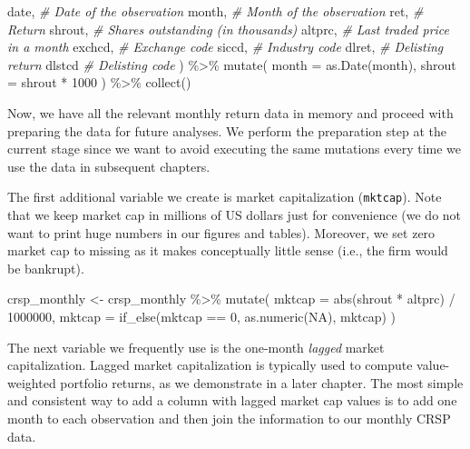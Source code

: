 \documentclass[
]{krantz}
\newenvironment{Shaded}{\begin{snugshade}}{\end{snugshade}}
\newcommand{\AttributeTok}[1]{\textcolor[rgb]{0.61,0.61,0.61}{#1}}
\newcommand{\CommentTok}[1]{\textcolor[rgb]{0.37,0.37,0.37}{\textit{#1}}}
\newcommand{\ConstantTok}[1]{\textcolor[rgb]{0,0,0}{#1}}
\newcommand{\DecValTok}[1]{\textcolor[rgb]{0.06,0.06,0.06}{#1}}
\newcommand{\FunctionTok}[1]{\textcolor[rgb]{0,0,0}{#1}}
\newcommand{\NormalTok}[1]{#1}
\newcommand{\OtherTok}[1]{\textcolor[rgb]{0.37,0.37,0.37}{#1}}
\newcommand{\SpecialCharTok}[1]{\textcolor[rgb]{0,0,0}{#1}}
\begin{document}
\begin{Shaded}
\begin{Highlighting}[]
\NormalTok{    date, }\CommentTok{\# Date of the observation}
\NormalTok{    month, }\CommentTok{\# Month of the observation}
\NormalTok{    ret, }\CommentTok{\# Return}
\NormalTok{    shrout, }\CommentTok{\# Shares outstanding (in thousands)}
\NormalTok{    altprc, }\CommentTok{\# Last traded price in a month}
\NormalTok{    exchcd, }\CommentTok{\# Exchange code}
\NormalTok{    siccd, }\CommentTok{\# Industry code}
\NormalTok{    dlret, }\CommentTok{\# Delisting return}
\NormalTok{    dlstcd }\CommentTok{\# Delisting code}
\NormalTok{  ) }\SpecialCharTok{\%\textgreater{}\%}
  \FunctionTok{mutate}\NormalTok{(}
    \AttributeTok{month =} \FunctionTok{as.Date}\NormalTok{(month),}
    \AttributeTok{shrout =}\NormalTok{ shrout }\SpecialCharTok{*} \DecValTok{1000}
\NormalTok{  ) }\SpecialCharTok{\%\textgreater{}\%}
  \FunctionTok{collect}\NormalTok{()}
\end{Highlighting}
\end{Shaded}

Now, we have all the relevant monthly return data in memory and proceed with preparing the data for future analyses. We perform the preparation step at the current stage since we want to avoid executing the same mutations every time we use the data in subsequent chapters.

The first additional variable we create is market capitalization (\texttt{mktcap}). Note that we keep market cap in millions of US dollars just for convenience (we do not want to print huge numbers in our figures and tables). Moreover, we set zero market cap to missing as it makes conceptually little sense (i.e., the firm would be bankrupt).

\begin{Shaded}
\begin{Highlighting}[]
\NormalTok{crsp\_monthly }\OtherTok{\textless{}{-}}\NormalTok{ crsp\_monthly }\SpecialCharTok{\%\textgreater{}\%}
  \FunctionTok{mutate}\NormalTok{(}
    \AttributeTok{mktcap =} \FunctionTok{abs}\NormalTok{(shrout }\SpecialCharTok{*}\NormalTok{ altprc) }\SpecialCharTok{/} \DecValTok{1000000}\NormalTok{,}
    \AttributeTok{mktcap =} \FunctionTok{if\_else}\NormalTok{(mktcap }\SpecialCharTok{==} \DecValTok{0}\NormalTok{, }\FunctionTok{as.numeric}\NormalTok{(}\ConstantTok{NA}\NormalTok{), mktcap)}
\NormalTok{  )}
\end{Highlighting}
\end{Shaded}

The next variable we frequently use is the one-month \emph{lagged} market capitalization. Lagged market capitalization is typically used to compute value-weighted portfolio returns, as we demonstrate in a later chapter. The most simple and consistent way to add a column with lagged market cap values is to add one month to each observation and then join the information to our monthly CRSP data.
\end{document}
